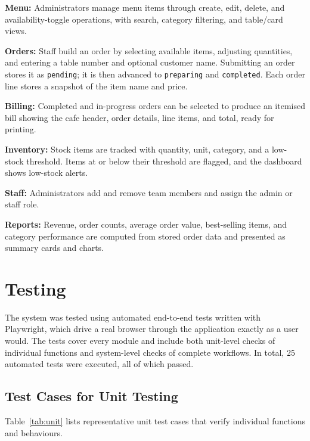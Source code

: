 \documentclass[12pt,a4paper]{report}
\begin{document}
\textbf{Menu:} Administrators manage menu items through create, edit, delete, and
availability-toggle operations, with search, category filtering, and table/card views.

\textbf{Orders:} Staff build an order by selecting available items, adjusting quantities, and
entering a table number and optional customer name. Submitting an order stores it as
\texttt{pending}; it is then advanced to \texttt{preparing} and \texttt{completed}. Each order
line stores a snapshot of the item name and price.

\textbf{Billing:} Completed and in-progress orders can be selected to produce an itemised bill
showing the cafe header, order details, line items, and total, ready for printing.

\textbf{Inventory:} Stock items are tracked with quantity, unit, category, and a low-stock
threshold. Items at or below their threshold are flagged, and the dashboard shows low-stock
alerts.

\textbf{Staff:} Administrators add and remove team members and assign the admin or staff role.

\textbf{Reports:} Revenue, order counts, average order value, best-selling items, and category
performance are computed from stored order data and presented as summary cards and charts.

\section{Testing}
The system was tested using automated end-to-end tests written with Playwright, which drive a
real browser through the application exactly as a user would. The tests cover every module and
include both unit-level checks of individual functions and system-level checks of complete
workflows. In total, 25 automated tests were executed, all of which passed.

\subsection{Test Cases for Unit Testing}
Table~\ref{tab:unit} lists representative unit test cases that verify individual functions and
behaviours.
\end{document}

